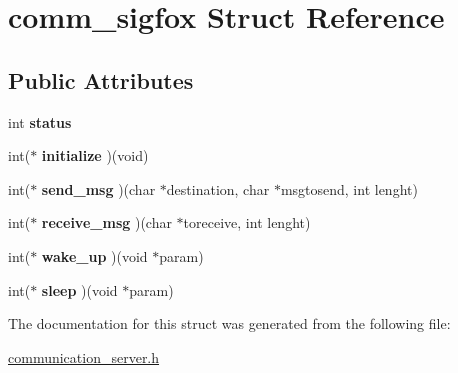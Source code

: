 \hypertarget{structcomm__sigfox}{}\section{comm\+\_\+sigfox Struct Reference}
\label{structcomm__sigfox}
\subsection*{Public Attributes}
\begin{DoxyCompactItemize}
\item 
int {\bfseries status}\hypertarget{structcomm__sigfox_a41c842be39cd26089eb89b1df35ee830}{}\label{structcomm__sigfox_a41c842be39cd26089eb89b1df35ee830}

\item 
int($\ast$ {\bfseries initialize} )(void)\hypertarget{structcomm__sigfox_a8c6d312e146904aa5ce617c16fd94d21}{}\label{structcomm__sigfox_a8c6d312e146904aa5ce617c16fd94d21}

\item 
int($\ast$ {\bfseries send\+\_\+msg} )(char $\ast$destination, char $\ast$msgtosend, int lenght)\hypertarget{structcomm__sigfox_a98edd66262eb658ead8078488c6c8e07}{}\label{structcomm__sigfox_a98edd66262eb658ead8078488c6c8e07}

\item 
int($\ast$ {\bfseries receive\+\_\+msg} )(char $\ast$toreceive, int lenght)\hypertarget{structcomm__sigfox_a848d11cfc5a8c3e9ec8ee0a19b888c51}{}\label{structcomm__sigfox_a848d11cfc5a8c3e9ec8ee0a19b888c51}

\item 
int($\ast$ {\bfseries wake\+\_\+up} )(void $\ast$param)\hypertarget{structcomm__sigfox_ab117f44e20e285b95dfeabf4246959cd}{}\label{structcomm__sigfox_ab117f44e20e285b95dfeabf4246959cd}

\item 
int($\ast$ {\bfseries sleep} )(void $\ast$param)\hypertarget{structcomm__sigfox_a0984b417590a70d96f515c5bc984b697}{}\label{structcomm__sigfox_a0984b417590a70d96f515c5bc984b697}

\end{DoxyCompactItemize}


The documentation for this struct was generated from the following file\+:\begin{DoxyCompactItemize}
\item 
\hyperlink{communication__server_8h}{communication\+\_\+server.\+h}\end{DoxyCompactItemize}
